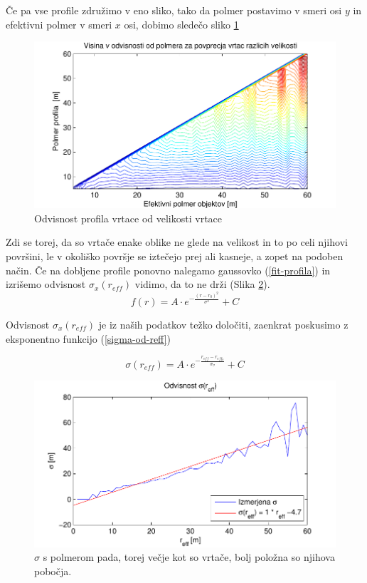 \documentclass[a4paper, oneside, 12pt]{book}
\begin{document}
Če pa vse profile združimo v eno sliko, tako da polmer postavimo v smeri osi $y$ in efektivni polmer v smeri $x$ osi, dobimo sledečo sliko \ref{fig:menisija-profil-profilov}

\begin{figure}[H]
  \centering
  \includegraphics{slike/menisija-profil-profilov}
  \caption{Odvisnost profila vrtace od velikosti vrtace}
  \label{fig:menisija-profil-profilov}
\end{figure}

Zdi se torej, da so vrtače enake oblike ne glede na velikost in to po celi njihovi površini, le v okoliško površje se iztečejo prej ali kasneje, a zopet na podoben način.
Če na dobljene profile ponovno nalegamo gaussovko (\ref{fit-profila}) in izrišemo odvisnost $\sigma_x (r_{eff})$ vidimo, da to ne drži (Slika \ref{fig:menisija-sigma}).  
\begin{equation}
  f(r) = A \cdot e^{-\frac{(r-r_0)^2}{\sigma^2}} + C  
  \label{fit-profila}
\end{equation}

Odvisnost $\sigma_x(r_{eff})$ je iz naših podatkov težko določiti, zaenkrat poskusimo z eksponentno funkcijo (\ref{sigma-od-reff})


\begin{equation}
  \sigma (r_{eff}) = A \cdot e^{-\frac{r_{eff}-r_{eff_0}}{\sigma_{\sigma}}} + C 
  \label{sigma-od-reff}
\end{equation}

\begin{figure}[H]
  \centering
  \includegraphics{slike/menisija-sigme}
  \caption{$\sigma$ s polmerom pada, torej večje kot so vrtače, bolj položna so njihova pobočja.}
  \label{fig:menisija-sigma}
\end{figure}
\end{document}
